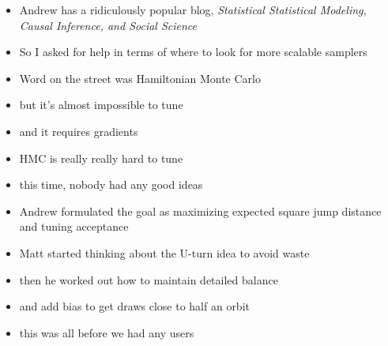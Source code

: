 \documentclass[9pt]{report}
\begin{document}
\begin{itemize}
\item Andrew has a ridiculously popular blog, {\slshape Statistical
    Statistical Modeling, Causal Inference, and Social Science}
\item So I asked for help in terms of where to look for more scalable
  samplers
\item Word on the street was Hamiltonian Monte Carlo
\item but it's almost impossible to tune
\item and it requires gradients
\end{itemize}
  

\begin{itemize}
\item HMC is really really hard to tune
\item this time, nobody had any good ideas
\item Andrew formulated the goal as maximizing expected square jump
  distance and tuning acceptance
\item Matt started thinking about the U-turn idea to avoid waste
\item then he worked out how to maintain detailed balance
\item and add bias to get draws close to half an orbit
\item this was all before we had any users
\end{itemize}
\end{document}
